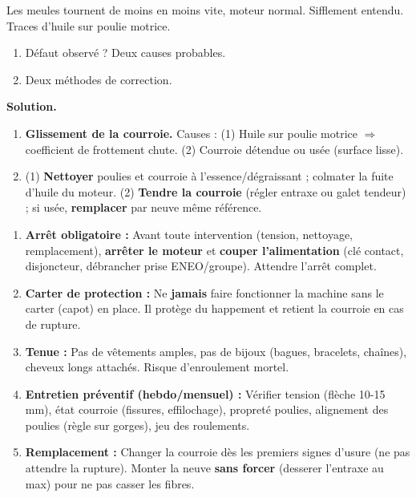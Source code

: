\documentclass[11pt]{article}
\newcounter{popsec}
\newcounter{popsub}
\newcommand{\courssub}[1]{%
  \stepcounter{popsub}%
  \par\vspace{9pt}\noindent{\popxbold\fontsize{11.5}{13}\selectfont\color{popink}{\color{poporange}\thepopsec.\thepopsub}\hspace{6pt}#1}\par\nopagebreak\vspace{4pt}
}
\begin{document}
\begin{exoresolu}
Les meules tournent de moins en moins vite, moteur normal. Sifflement entendu. Traces d'huile sur poulie motrice.
\begin{enumerate}
\item Défaut observé ? Deux causes probables.
\item Deux méthodes de correction.
\end{enumerate}
\tcblower
\textbf{Solution.}
\begin{enumerate}
\item \textbf{Glissement de la courroie.} Causes : (1) Huile sur poulie motrice $\Rightarrow$ coefficient de frottement chute. (2) Courroie détendue ou usée (surface lisse).
\item (1) \textbf{Nettoyer} poulies et courroie à l'essence/dégraissant ; colmater la fuite d'huile du moteur. (2) \textbf{Tendre la courroie} (régler entraxe ou galet tendeur) ; si usée, \textbf{remplacer} par neuve même référence.
\end{enumerate}
\end{exoresolu}

\courssub{Sécurité et entretien}

\begin{methode}
\begin{enumerate}
\item \textbf{Arrêt obligatoire :} Avant toute intervention (tension, nettoyage, remplacement), \textbf{arrêter le moteur} et \textbf{couper l'alimentation} (clé contact, disjoncteur, débrancher prise ENEO/groupe). Attendre l'arrêt complet.
\item \textbf{Carter de protection :} Ne \textbf{jamais} faire fonctionner la machine sans le carter (capot) en place. Il protège du happement et retient la courroie en cas de rupture.
\item \textbf{Tenue :} Pas de vêtements amples, pas de bijoux (bagues, bracelets, chaînes), cheveux longs attachés. Risque d'enroulement mortel.
\item \textbf{Entretien préventif (hebdo/mensuel) :} Vérifier tension (flèche 10-15 mm), état courroie (fissures, effilochage), propreté poulies, alignement des poulies (règle sur gorges), jeu des roulements.
\item \textbf{Remplacement :} Changer la courroie dès les premiers signes d'usure (ne pas attendre la rupture). Monter la neuve \textbf{sans forcer} (desserer l'entraxe au max) pour ne pas casser les fibres.
\end{enumerate}
\end{methode}
\end{document}
